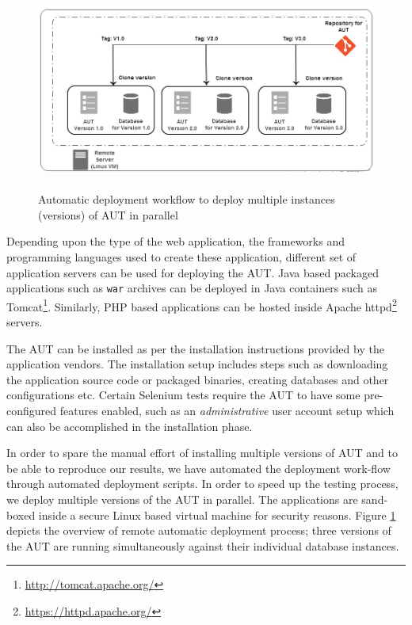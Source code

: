 \begin{figure}[h]
\makeatletter 
\makeatother
    \centering
  \includegraphics[width=5.4in,height=2.6in]{./Figures/Deployment_Process_2.jpg}
  \captionsetup{justification=raggedright,
singlelinecheck=false
}
  \caption{Automatic deployment workflow to deploy multiple instances (versions) of AUT in parallel}
  \label{fig:deployment} 
\end{figure}

Depending upon the type of the web application, the frameworks and programming languages used to create these application, different set of application servers can be used for deploying the AUT. Java based packaged applications such as \texttt{war} archives can be deployed in Java containers such as Tomcat\footnote{\url{http://tomcat.apache.org/}}. Similarly, PHP based applications can be hosted inside Apache httpd\footnote{\url{https://httpd.apache.org/}} servers. 

The AUT can be installed as per the installation instructions provided by the application vendors. The installation setup includes steps such as downloading the application source code or packaged binaries, creating databases and other configurations etc. Certain Selenium tests require the AUT to have some pre-configured features enabled, such as an \textit{administrative} user account setup which can also be accomplished in the installation phase. 

In order to spare the manual effort of installing multiple versions of AUT and to be able to reproduce our results, we have automated the deployment work-flow through automated deployment scripts. In order to speed up the testing process, we deploy multiple versions of the AUT in parallel.  The applications are sand-boxed inside a secure Linux based virtual machine for security reasons. Figure \ref{fig:deployment} depicts the overview of remote automatic deployment process; three versions of the AUT are running simultaneously against their individual database instances.

